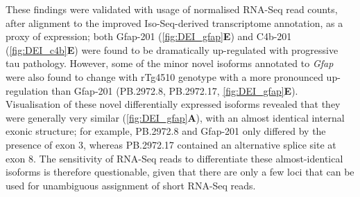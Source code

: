 These findings were validated with usage of normalised RNA-Seq read counts, after alignment to the improved Iso-Seq-derived transcriptome annotation, as a proxy of expression; both Gfap-201 (\cref{fig:DEI_gfap}\textbf{E}) and C4b-201 (\cref{fig:DEI_c4b}\textbf{E}) were found to be dramatically up-regulated with progressive tau pathology. However, some of the minor novel isoforms annotated to \textit{Gfap} were also found to change with rTg4510 genotype with a more pronounced up-regulation than Gfap-201 (PB.2972.8, PB.2972.17, \cref{fig:DEI_gfap}\textbf{E}). Visualisation of these novel differentially expressed isoforms revealed that they were generally very similar (\cref{fig:DEI_gfap}\textbf{A}), with an almost identical internal exonic structure; for example, PB.2972.8 and Gfap-201 only differed by the presence of exon 3, whereas PB.2972.17 contained an alternative splice site at exon 8. The sensitivity of RNA-Seq reads to differentiate these almost-identical isoforms is therefore questionable, given that there are only a few loci that can be used for unambiguous assignment of short RNA-Seq reads.  

